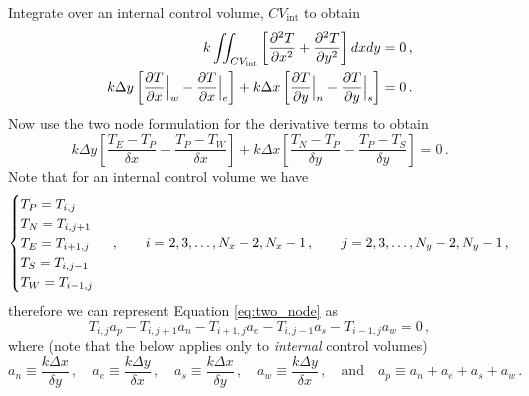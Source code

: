 \documentclass{article}
\begin{document}
Integrate over an internal control volume, $CV_\text{int}$ to obtain
\begin{align*}
	k \iint_{CV_\text{int}} \left[ \pdv{^2T}{x^2} + \pdv{^2T}{y^2} \right] dxdy & = 0\,,\\
	k \Delta y \left[ \pdv{T}{x}\Big|_{w} - \pdv{T}{x}\Big|_{e} \right] + k \Delta x \left[ \pdv{T}{y}\Big|_{n} - \pdv{T}{y}\Big|_{s} \right] & = 0\,.
\end{align*}
Now use the two node formulation for the derivative terms to obtain
\begin{equation}
	\label{eq:two_node}
	k \Delta y \left[\frac{T_{E} - T_{P}}{\delta x} - \frac{T_{P} - T_{W}}{\delta x}\right] + k \Delta x \left[ \frac{T_{N} - T_{P}}{\delta y} -\frac{T_{P} - T_{S}}{\delta y} \right] = 0\,.
\end{equation}
Note that for an internal control volume we have
\[
	\begin{cases}
		T_P = T_{i,j} \\
		T_N = T_{i,j+1} \\
		T_E = T_{i+1,j} \\
		T_S = T_{i,j-1} \\
		T_W = T_{i-1,j}
	\end{cases}\,, \qquad i = 2, 3, \ldots, N_x - 2, N_x - 1\,, \qquad j = 2, 3, \ldots, N_y - 2, N_y - 1\,,\\
\]
therefore we can represent Equation \eqref{eq:two_node} as
\[
	T_{i,j} a_p - T_{i, j+1} a_n - T_{i+1, j} a_e - T_{i, j-1} a_s - T_{i-1, j} a_w = 0\,,
\]
where (note that the below applies only to \textit{internal} control volumes)
\[
	a_n \equiv \frac{k \Delta x}{\delta y}\,, \quad a_e \equiv \frac{k \Delta y}{\delta x}\,, \quad a_s \equiv \frac{k\Delta x}{\delta y}\,, \quad a_w \equiv \frac{k\Delta y}{\delta x}\,, \quad \text{and} \quad a_p \equiv a_n + a_e + a_s + a_w\,.
\]
\end{document}
